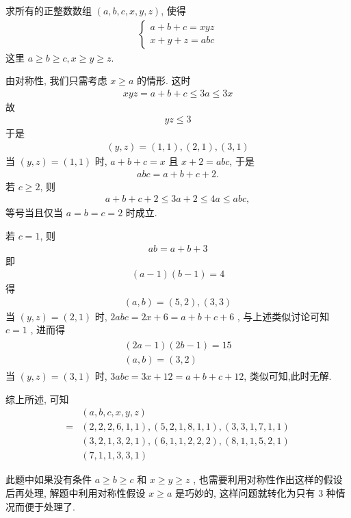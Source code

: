 \begin{example}
	求所有的正整数数组 $(a, b, c, x, y, z)$, 使得
	\begin{align*}
		\left\{\begin{array}{l}
			       a+b+c=x y z \\
			       x+y+z=a b c
		       \end{array}\right.
	\end{align*}
	这里 $a \geqslant b \geqslant c, x \geqslant y \geqslant z$.
\end{example}
\begin{solution}
	由对称性, 我们只需考虑 $x \geqslant a$ 的情形. 这时
	\begin{align*}
		x y z=a+b+c \leqslant 3 a \leqslant 3 x
	\end{align*}
	故
	\begin{align*}
		y z \leqslant 3
	\end{align*}
	于是
	\begin{align*}
		(y, z)=(1,1),(2,1),(3,1)
	\end{align*}
	当 $(y, z)=(1,1)$ 时, $a+b+c=x$ 且 $x+2=a b c$, 于是
	\begin{align*}
		a b c=a+b+c+2 .
	\end{align*}
	若 $c \geqslant 2$, 则
	\begin{align*}
		a+b+c+2 \leqslant 3 a+2 \leqslant 4 a \leqslant a b c,
	\end{align*}
	等号当且仅当 $a=b=c=2$ 时成立.

	若 $c=1$, 则
	\begin{align*}
		a b=a+b+3
	\end{align*}
	即
	\begin{align*}
		(a-1)(b-1)=4
	\end{align*}
	得
	\begin{align*}
		(a, b)=(5,2),(3,3)
	\end{align*}
	当 $(y, z)=(2,1)$ 时, $2 a b c=2 x+6=a+b+c+6$ , 与上述类似讨论可知 $c=1$ , 进而得
	\begin{align*}
		\begin{gathered}
			(2 a-1)(2 b-1)=15 \\
			(a, b)=(3,2)
		\end{gathered}
	\end{align*}
	当 $(y, z)=(3,1)$ 时, $3 a b c=3 x+12=a+b+c+12$, 类似可知,此时无解.

	综上所述, 可知\begin{align}
		  & (a, b, c, x, y, z)                        \\
		= & (2,2,2,6,1,1),(5,2,1,8,1,1),(3,3,1,7,1,1) \\
		  & (3,2,1,3,2,1),(6,1,1,2,2,2),(8,1,1,5,2,1) \\
		  & (7,1,1,3,3,1)
	\end{align}
\end{solution}
\begin{note}
	此题中如果没有条件 $a \geqslant b \geqslant c$ 和 $x \geqslant y \geqslant z$ , 也需要利用对称性作出这样的假设后再处理, 解题中利用对称性假设 $x \geqslant a$ 是巧妙的, 这样问题就转化为只有 3 种情况而便于处理了.
\end{note}

